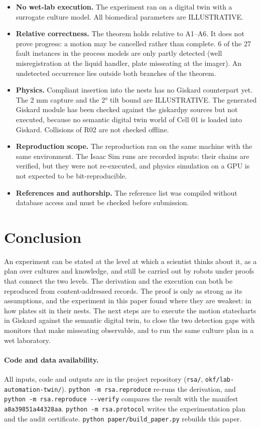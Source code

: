 \documentclass[10pt,a4paper]{article}
\begin{document}
\begin{itemize}
  \item \textbf{No wet-lab execution.} The experiment ran on a digital twin with a surrogate culture model. All biomedical parameters are ILLUSTRATIVE.
  \item \textbf{Relative correctness.} The theorem holds relative to A1–A6. It does not prove progress: a motion may be cancelled rather than complete. 6 of the 27 fault instances in the process models are only partly detected (well misregistration at the liquid handler, plate misseating at the imager). An undetected occurrence lies outside both branches of the theorem.
  \item \textbf{Physics.} Compliant insertion into the nests has no Giskard counterpart yet. The 2 mm capture and the 2° tilt bound are ILLUSTRATIVE. The generated Giskard module has been checked against the giskardpy sources but not executed, because no semantic digital twin world of Cell 01 is loaded into Giskard. Collisions of R02 are not checked offline.
  \item \textbf{Reproduction scope.} The reproduction ran on the same machine with the same environment. The Isaac Sim runs are recorded inputs: their chains are verified, but they were not re-executed, and physics simulation on a GPU is not expected to be bit-reproducible.
  \item \textbf{References and authorship.} The reference list was compiled without database access and must be checked before submission.
\end{itemize}

\section{Conclusion}\label{sec:conclusion}

An experiment can be stated at the level at which a scientist thinks about it, as a plan over cultures and knowledge, and still be carried out by robots under proofs that connect the two levels. The derivation and the execution can both be reproduced from content-addressed records. The proof is only as strong as its assumptions, and the experiment in this paper found where they are weakest: in how plates sit in their nests. The next steps are to execute the motion statecharts in Giskard against the semantic digital twin, to close the two detection gaps with monitors that make misseating observable, and to run the same culture plan in a wet laboratory.

\paragraph{Code and data availability.} All inputs, code and outputs are in the project repository (\texttt{rsa/}, \texttt{okf/lab-\allowbreak{}automation-\allowbreak{}twin/}). \texttt{python -\allowbreak{}m rsa.reproduce} re-runs the derivation, and \texttt{python -\allowbreak{}m rsa.reproduce -\allowbreak{}-\allowbreak{}verify} compares the result with the manifest \texttt{a8a39851a44328aa}. \texttt{python -\allowbreak{}m rsa.protocol} writes the experimentation plan and the audit certificate. \texttt{python paper/build\_paper.py} rebuilds this paper.
\end{document}
